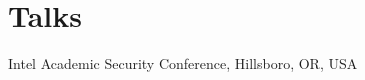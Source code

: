 \section{Talks}

\begin{itemize}
        {Intel Academic Security Conference, Hillsboro, OR, USA}
        {}
\end{itemize}
